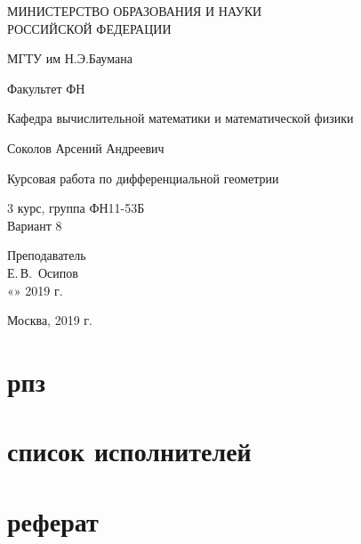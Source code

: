 \documentclass[14pt,a4paper]{extarticle}
\makeatletter
\renewcommand\tableofcontents{%
	\null\hfill\normalfont{\Large\contentsname}\hfill\null\par
	\@mkboth{\MakeUppercase\contentsname}{\MakeUppercase\contentsname}%
	\@starttoc{toc}%
}
\makeatother
\begin{document}
	\begin{titlepage}
	\begin{center}
		\large
		МИНИСТЕРСТВО ОБРАЗОВАНИЯ И НАУКИ\\ РОССИЙСКОЙ ФЕДЕРАЦИИ
		
		\vspace{0.5cm}
		
		МГТУ им Н.Э.Баумана
		\vspace{0.25cm}
		
		Факультет ФН
		
		Кафедра вычислительной математики и математической физики
		\vfill
		
		
		Соколов Арсений Андреевич\\
		\vfill
		
		
		{\LARGE Курсовая работа по дифференциальной геометрии\\[2mm]
		}
		\bigskip
		
		3 курс, группа ФН11-53Б\\
		Вариант 8
	\end{center}
	\vfill
	
	\newlength{\ML}
	\hfill\begin{minipage}{0.4\textwidth}
		Преподаватель\\
		\underline{\hspace{3cm}} Е.\,В.~Осипов\\
		«\underline{\hspace{0.7cm}}» \underline{\hspace{1.71cm}} 2019 г.
	\end{minipage}%
	\bigskip
	
	
	\vfill
	
	\begin{center}
		Москва, 2019 г.
	\end{center}
\end{titlepage}
\tableofcontents
\parindent=1.25cm
\clearpage


\section*{рпз}
\newpage
\section*{список исполнителей}
\newpage
\section*{реферат}
\newpage
\end{document}

